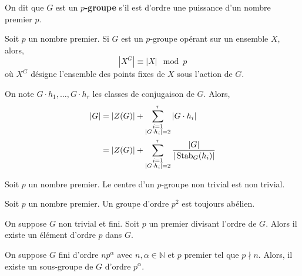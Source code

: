 
  \begin{definition}
    On dit que $G$ est un \textbf{$p$-groupe} s'il est d'ordre une puissance d'un nombre premier $p$.
  \end{definition}

  \begin{proposition}
    Soit $p$ un nombre premier. Si $G$ est un $p$-groupe opérant sur un ensemble $X$, alors,
    \[ |X^G| \equiv |X| \mod p \]
    où $X^G$ désigne l'ensemble des points fixes de $X$ sous l'action de $G$.
  \end{proposition}

  \begin{corollary}
    On note $G \cdot h_1, \dots, G \cdot h_r$ les classes de conjugaison de $G$. Alors,
    \begin{align*}
      \vert G \vert &= \vert Z(G) \vert + \sum_{\substack{i=1 \\ \vert G \cdot h_i \vert = 2}}^{r} \vert G \cdot h_i \vert \\
      &= \vert Z(G) \vert + \sum_{\substack{i=1 \\ \vert G \cdot h_i \vert = 2}}^{r} \frac{\vert G \vert}{\vert \operatorname{Stab}_G(h_i) \vert}
    \end{align*}
  \end{corollary}

  \begin{corollary}
    Soit $p$ un nombre premier. Le centre d'un $p$-groupe non trivial est non trivial.
  \end{corollary}

  \begin{corollary}
    Soit $p$ un nombre premier. Un groupe d'ordre $p^2$ est toujours abélien.
  \end{corollary}

  \begin{application}
    On suppose $G$ non trivial et fini. Soit $p$ un premier divisant l'ordre de $G$. Alors il existe un élément d'ordre $p$ dans $G$.
  \end{application}


  \begin{application}
    On suppose $G$ fini d'ordre $n p^\alpha$ avec $n, \alpha \in \mathbb{N}$ et $p$ premier tel que $p \nmid n$. Alors, il existe un sous-groupe de $G$ d’ordre $p^\alpha$.
  \end{application}

